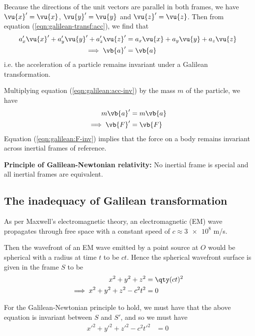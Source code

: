     Because the directions of the unit vectors are parallel in both frames, we have $\vu{x}'=\vu{x}$, $\vu{y}'=\vu{y}$ and $\vu{z}'=\vu{z}$. Then from equation (\ref{eqn:galilean-transf:acc}), we find that
    \begin{align}
    	a_x'\vu{x}'+a_y'\vu{y}'+a_z'\vu{z}'&=a_x\vu{x}+a_y\vu{y}+a_z\vu{z} \nonumber\\
    	\implies \vb{a}'&=\vb{a} \label{eqn:galilean:acc-inv}
    \end{align}
    i.e. the acceleration of a particle remains invariant under a Galilean transformation.
    
    Multiplying equation (\ref{eqn:galilean:acc-inv}) by the mass $m$ of the particle, we have
    \begin{align}
    	m\vb{a}'&=m\vb{a} \nonumber\\
    	\implies\vb{F}'&=\vb{F} \label{eqn:galilean:F-inv}
    \end{align}
    Equation (\ref{eqn:galilean:F-inv}) implies that the force on a body remains invariant across inertial frames of reference.
    
    \textbf{Principle of Galilean-Newtonian relativity:} No inertial frame is special and all inertial frames are equivalent.
    	
    \subsection{The inadequacy of Galilean transformation}
    	As per Maxwell's electromagnetic theory, an electromagnetic (EM) wave propagates through free space with a constant speed of $c\approx\num{3e8}$ m/s.
    	
    	Then the wavefront of an EM wave emitted by a point source at $O$ would be spherical with a radius at time $t$ to be $ct$. Hence the spherical wavefront surface is given in the frame $S$ to be
    	\begin{align}
    		x^2+y^2+z^2&=\qty(ct)^2 \nonumber\\
    		\implies x^2+y^2+z^2-c^2t^2&=0 \label{eqn:spherical:S-01}
    	\end{align}
    	
    	For the Galilean-Newtonian principle to hold, we must have that the above equation is invariant between $S$ and $S'$, and so we must have
    	\begin{align}
    		x'^2+y'^2+z'^2-c^2t'^2&=0 \label{eqn:spherical:Sp}
    	\end{align}
    	
